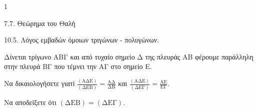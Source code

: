 \begin{ylh}{1}
    \item 7.7. Θεώρημα του Θαλή
    \item 10.5. Λόγος εμβαδών όμοιων τριγώνων - πολυγώνων.
\end{ylh}
\begin{figure}
\end{figure}
Δίνεται τρίγωνο ΑΒΓ και από τυχαίο σημείο Δ της πλευράς ΑΒ φέρουμε παράλληλη στην πλευρά ΒΓ που τέμνει την ΑΓ στο σημείο Ε.
\begin{alist}
\item Να δικαιολογήσετε γιατί $\frac{(\text{ΑΔΕ})}{(\text{ΔΕΒ})} = \frac{\text{ΑΔ}}{\text{ΔΒ}}$ και $\frac{(\text{ΑΔΕ})}{(\text{ΔΕΓ})} = \frac{\text{ΑΕ}}{\text{ΕΓ}}$. 
\item Να αποδείξετε ότι $(\text{ΔΕΒ}) = (\text{ΔΕΓ})$. 
\end{alist}
